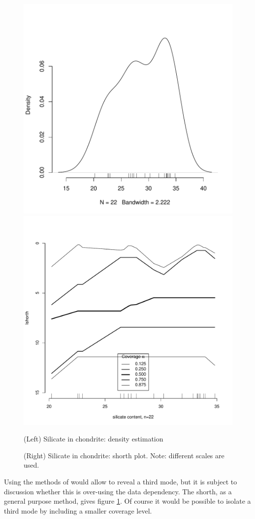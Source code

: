 \documentclass[dvips,12pt,a4paper,twoside]{amsart}
\begin{document}
\begin{figure}[htb]
\includegraphics[width=0.45\linewidth]{TheShorthPlot-Chondritedens}
\hspace{\fill}
\includegraphics[width=0.45\linewidth]{TheShorthPlot-Chondrite}
\caption{(Left) Silicate in chondrite: density estimation}\label{fig:chondritedens}
\caption{(Right) Silicate in chondrite: shorth plot. Note: different scales are used.}\label{fig:chondrite}
\end{figure}
Using the methods of  \cite{Good1980Density-estimat} would allow to reveal a third mode, but it is subject to discussion whether this is over-using the data dependency. The shorth, as a general purpose method, gives figure \ref{fig:chondrite}. Of course it would be possible to isolate a third mode by 
including a smaller coverage level. 
\end{document}
